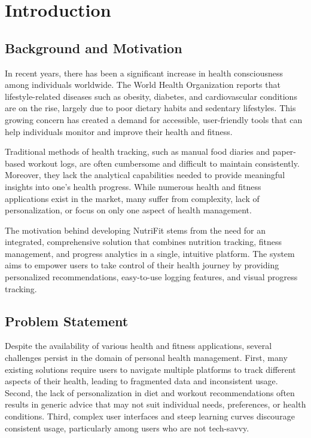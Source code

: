 \chapter{Introduction}

\section{Background and Motivation}

In recent years, there has been a significant increase in health consciousness among individuals worldwide. The World Health Organization reports that lifestyle-related diseases such as obesity, diabetes, and cardiovascular conditions are on the rise, largely due to poor dietary habits and sedentary lifestyles. This growing concern has created a demand for accessible, user-friendly tools that can help individuals monitor and improve their health and fitness.

Traditional methods of health tracking, such as manual food diaries and paper-based workout logs, are often cumbersome and difficult to maintain consistently. Moreover, they lack the analytical capabilities needed to provide meaningful insights into one's health progress. While numerous health and fitness applications exist in the market, many suffer from complexity, lack of personalization, or focus on only one aspect of health management.

The motivation behind developing NutriFit stems from the need for an integrated, comprehensive solution that combines nutrition tracking, fitness management, and progress analytics in a single, intuitive platform. The system aims to empower users to take control of their health journey by providing personalized recommendations, easy-to-use logging features, and visual progress tracking.

\section{Problem Statement}

Despite the availability of various health and fitness applications, several challenges persist in the domain of personal health management. First, many existing solutions require users to navigate multiple platforms to track different aspects of their health, leading to fragmented data and inconsistent usage. Second, the lack of personalization in diet and workout recommendations often results in generic advice that may not suit individual needs, preferences, or health conditions. Third, complex user interfaces and steep learning curves discourage consistent usage, particularly among users who are not tech-savvy.

